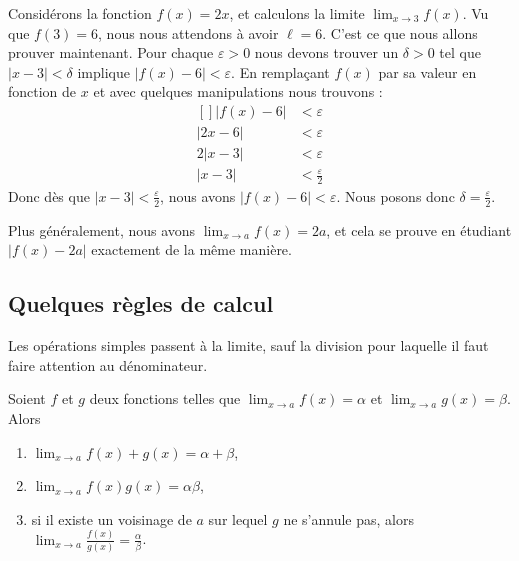 \begin{example}
	Considérons la fonction $f(x)=2x$, et calculons la limite $\lim_{x\to 3} f(x)$. Vu que $f(3)=6$, nous nous attendons à avoir $\ell=6$. C'est ce que nous allons prouver maintenant. Pour chaque $\varepsilon>0$ nous devons trouver un $\delta>0$ tel que $| x-3 |<\delta$ implique $| f(x)-6 |<\varepsilon$. En remplaçant $f(x)$ par sa valeur en fonction de $x$ et avec quelques manipulations nous trouvons :
	\begin{equation}
		\begin{aligned}[]
			| f(x)-6 | & <\varepsilon             \\
			| 2x-6 |   & <\varepsilon             \\
			2| x-3 |   & <\varepsilon             \\
			| x-3 |    & <\frac{ \varepsilon }{2}
		\end{aligned}
	\end{equation}
	Donc dès que $| x-3 |<\frac{ \varepsilon }{2}$, nous avons $| f(x)-6 |<\varepsilon$. Nous posons donc $\delta=\frac{ \varepsilon }{2}$.

	Plus généralement, nous avons $\lim_{x\to a} f(x)=2a$, et cela se prouve en étudiant $| f(x)-2a |$ exactement de la même manière.
\end{example}

\subsection{Quelques règles de calcul}

Les opérations simples passent à la limite, sauf la division pour laquelle il faut faire attention au dénominateur.
\begin{proposition}     \label{PropOpsSimplesLimites}
	Soient \( f\) et \( g\) deux fonctions telles que \( \lim_{x\to a} f(x)=\alpha\) et \( \lim_{x\to a} g(x)=\beta\). Alors
	\begin{enumerate}
		\item
		      \( \lim_{x\to a} f(x)+g(x)=\alpha+\beta\),
		\item
		      \( \lim_{x\to a} f(x)g(x)=\alpha\beta\),
		\item
		      si il existe un voisinage de \( a\) sur lequel \( g\) ne s'annule pas, alors \( \lim_{x\to a} \frac{ f(x) }{ g(x) }=\frac{ \alpha }{ \beta }\).
	\end{enumerate}
\end{proposition}

